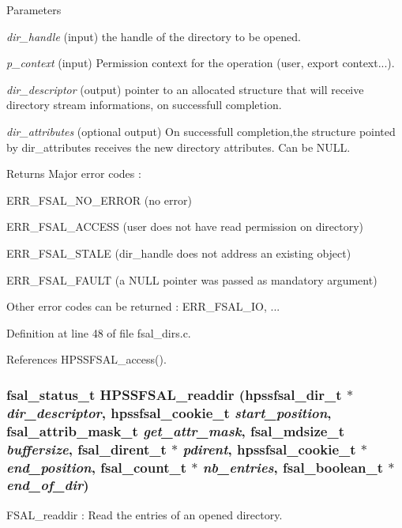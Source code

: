 \begin{DoxyParams}{Parameters}
\item[{\em dir\_\-handle}](input) the handle of the directory to be opened. \item[{\em p\_\-context}](input) Permission context for the operation (user, export context...). \item[{\em dir\_\-descriptor}](output) pointer to an allocated structure that will receive directory stream informations, on successfull completion. \item[{\em dir\_\-attributes}](optional output) On successfull completion,the structure pointed by dir\_\-attributes receives the new directory attributes. Can be NULL.\end{DoxyParams}
\begin{DoxyReturn}{Returns}
Major error codes :
\begin{DoxyItemize}
\item ERR\_\-FSAL\_\-NO\_\-ERROR (no error)
\item ERR\_\-FSAL\_\-ACCESS (user does not have read permission on directory)
\item ERR\_\-FSAL\_\-STALE (dir\_\-handle does not address an existing object)
\item ERR\_\-FSAL\_\-FAULT (a NULL pointer was passed as mandatory argument)
\item Other error codes can be returned : ERR\_\-FSAL\_\-IO, ... 
\end{DoxyItemize}
\end{DoxyReturn}


Definition at line 48 of file fsal\_\-dirs.c.

References HPSSFSAL\_\-access().
\subsubsection[{HPSSFSAL\_\-readdir}]{\setlength{\rightskip}{0pt plus 5cm}fsal\_\-status\_\-t HPSSFSAL\_\-readdir (hpssfsal\_\-dir\_\-t $\ast$ {\em dir\_\-descriptor}, \/  hpssfsal\_\-cookie\_\-t {\em start\_\-position}, \/  fsal\_\-attrib\_\-mask\_\-t {\em get\_\-attr\_\-mask}, \/  fsal\_\-mdsize\_\-t {\em buffersize}, \/  fsal\_\-dirent\_\-t $\ast$ {\em pdirent}, \/  hpssfsal\_\-cookie\_\-t $\ast$ {\em end\_\-position}, \/  fsal\_\-count\_\-t $\ast$ {\em nb\_\-entries}, \/  fsal\_\-boolean\_\-t $\ast$ {\em end\_\-of\_\-dir})}\label{fsal__dirs_8c_a6a594c04436c41ca84f4ce6d1ea3e02b}
FSAL\_\-readdir : Read the entries of an opened directory.


